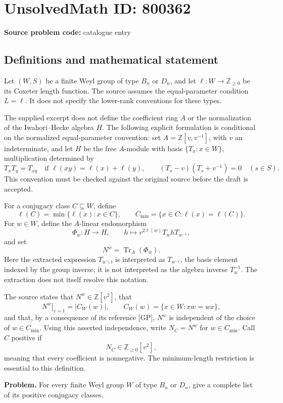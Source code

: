 \documentclass[11pt]{article}
\begin{document}
\section*{UnsolvedMath ID: 800362}
\textbf{Source problem code:} catalogue entry
\subsection{Definitions and mathematical statement}
Let \((W,S)\) be a finite Weyl group of type \(B_n\) or \(D_n\), and let \(\ell:W\to\mathbb Z_{\geq 0}\) be its Coxeter length function. The source assumes the equal-parameter condition \(L=\ell\). It does not specify the lower-rank conventions for these types.

The supplied excerpt does not define the coefficient ring \(A\) or the normalization of the Iwahori--Hecke algebra \(H\). The following explicit formulation is conditional on the normalized equal-parameter convention: set \(A=\mathbb Z[v,v^{-1}]\), with \(v\) an indeterminate, and let \(H\) be the free \(A\)-module with basis \(\{T_x:x\in W\}\), multiplication determined by
\[
T_xT_y=T_{xy}\quad\text{if }\ell(xy)=\ell(x)+\ell(y),
\qquad
(T_s-v)(T_s+v^{-1})=0\quad(s\in S).
\]
This convention must be checked against the original source before the draft is accepted.

For a conjugacy class \(C\subseteq W\), define
\[
\ell(C)=\min\{\ell(x):x\in C\},
\qquad
C_{\min}=\{x\in C:\ell(x)=\ell(C)\}.
\]
For \(w\in W\), define the \(A\)-linear endomorphism
\[
\Phi_w:H\longrightarrow H,
\qquad
h\longmapsto v^{2\ell(w)}T_whT_{w^{-1}},
\]
and set
\[
N^w=\operatorname{Tr}_A(\Phi_w).
\]
Here the extracted expression \(T_{w\backslash\mathrm{i}}\) is interpreted as \(T_{w^{-1}}\), the basis element indexed by the group inverse; it is not interpreted as the algebra inverse \(T_w^{-1}\). The extraction does not itself resolve this notation.

The source states that \(N^w\in\mathbb Z[v^2]\), that
\[
\left.N^w\right|_{v=1}=|C_W(w)|,
\qquad
C_W(w)=\{x\in W:xw=wx\},
\]
and that, by a consequence of its reference [GP], \(N^w\) is independent of the choice of \(w\in C_{\min}\). Using this asserted independence, write \(N_C=N^w\) for \(w\in C_{\min}\). Call \(C\) positive if
\[
N_C\in\mathbb Z_{\geq 0}[v^2],
\]
meaning that every coefficient is nonnegative. The minimum-length restriction is essential to this definition.

\textbf{Problem.} For every finite Weyl group \(W\) of type \(B_n\) or \(D_n\), give a complete list of its positive conjugacy classes.
\end{document}
